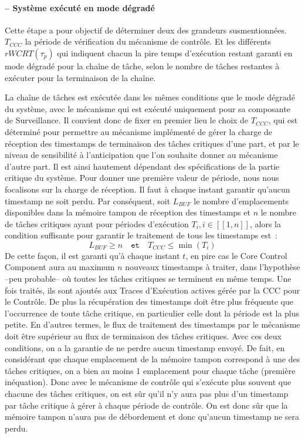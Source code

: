 \documentclass[french, a4paper, 11pt, twoside, pdftex]{StyleThese}
\begin{document}
    	\paragraph{ -- Système exécuté en mode dégradé}
    	
    		Cette étape a pour objectif de déterminer deux des grandeurs susmentionnées. $T_{CCC}$ la période de vérification du mécanisme de contrôle. Et les différents $rWCRT(\tau_p)$ qui indiquent chacun la pire temps d'exécution restant garanti en mode dégradé pour la chaîne de tâche, selon le nombre de tâches restantes à exécuter pour la terminaison de la chaîne. 
    		
    		La chaîne de tâches est exécutée dans les mêmes conditions que le mode dégradé du système, avec le mécanisme qui est exécuté uniquement pour sa composante de Surveillance. Il convient donc de fixer en premier lieu le choix de $T_{CCC}$, qui est déterminé pour permettre au mécanisme implémenté de gérer la charge de réception des timestamps de terminaison des tâches critiques d'une part, et par le niveau de sensibilité à l'anticipation que l'on souhaite donner au mécanisme d'autre part. Il est ainsi hautement dépendant des spécifications de la partie critique du système. 
    		Pour donner une première valeur de période, nous nous focalisons sur la charge de réception. Il faut à chaque instant garantir qu'aucun timestamp ne soit perdu. Par conséquent, soit $L_{BUF}$ le nombre d'emplacements disponibles dans la mémoire tampon de réception des timestamps et $n$ le nombre de tâches critiques ayant pour périodes d'exécution $T_i, i \in [\![1,n]\!]$, alors la condition suffisante pour garantir le traitement de tous les timestamps est~:
    		\begin{equation}\label{eq:conditionsMemoireControle}
    			L_{BUF} \geq n  \quad \texttt{et} \quad T_{CCC} \leq \min{(T_i)}
    		\end{equation}
    		De cette façon, il est garanti qu'à chaque instant $t$, en pire cas le Core Control Component aura au maximum $n$ nouveaux timestamps à traiter, dans l'hypothèse --peu probable-- où toutes les tâches critiques se terminent en même temps. Une fois traités, ils sont ajoutés aux Traces d'Exécution actives gérée par la CCC pour le Contrôle.
    		De plus la récupération des timestamps doit être plus fréquente que l'occurrence de toute tâche critique, en particulier celle dont la période est la plus petite. En d'autres termes, le flux de traitement des timestamps par le mécanisme doit être supérieur au flux de terminaison des tâches critiques. 
    		Avec ces deux conditions, on a la garantie de ne perdre aucun timestamp envoyé. De fait, en considérant que chaque emplacement de la mémoire tampon correspond à une des tâches critiques, on a bien au moins 1 emplacement pour chaque tâche (première inéquation). Donc avec le mécanisme de contrôle qui s'exécute plus souvent que chacune des tâches critiques, on est sûr qu'il n'y aura pas plus d'un timestamp par tâche critique à gérer à chaque période de contrôle. On est donc sûr que la mémoire tampon n'aura pas de débordement et donc qu'aucun timestamp ne sera perdu. 
    		
\end{document}
